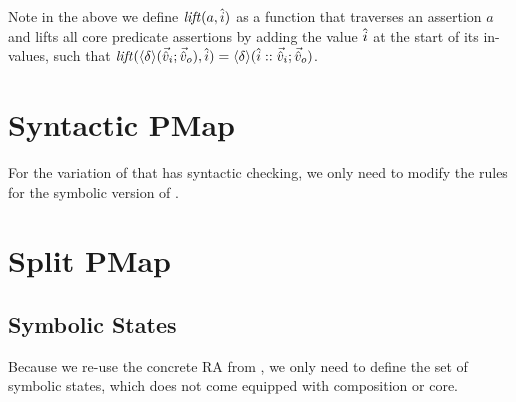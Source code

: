 Note in the above we define ${\operatorname{\mathit{lift}}}(a,\hat{i})$ as a function that traverses an assertion $a$ and lifts all core predicate assertions by adding the value $\hat{i}$ at the start of its in-values, such that ${\operatorname{\mathit{lift}}}(\left<\delta\right>\!(\vec{\hat{v}}_i;\vec{\hat{v}}_o), \hat{i})=\left<\delta\right>\!(\hat{i}::\vec{\hat{v}}_i;\vec{\hat{v}}_o)$.

\section{Syntactic PMap} \label{rules:syntpmap}

For the variation of \PMap{} that has syntactic checking, we only need to modify the rules for the symbolic version of .

\section{Split PMap} \label{rules:splitpmap}

\subsection{Symbolic States}

Because we re-use the concrete RA from \PMap{}, we only need to define the set of symbolic states, which does not come equipped with composition or core.

